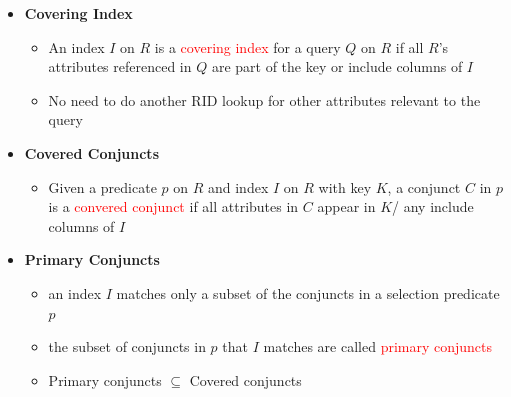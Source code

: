\documentclass[10pt,landscape]{article}
\makeatletter
\newcommand{\subsubsubsection}{\@startsection{subsubsection}{3}{0mm}%
                                {-1ex plus -.5ex minus -.2ex}%
                                {1ex plus .2ex}%
                                {\normalfont\scriptsize\bfseries}}
\newcommand{\1}{\mathmybb{1}}
\makeatother
\begin{document}
\begin{multicols*}{3}


\begin{itemize}
    \item \textbf{Covering Index}
    \begin{itemize}
        \item An index $I$ on $R$ is a \textcolor{red}{covering index} for a query $Q$ on $R$ if all $R$'s attributes referenced in $Q$ are part of the key or include columns of $I$
        \item No need to do another RID lookup for other attributes relevant to the query
    \end{itemize}
    \item \textbf{Covered Conjuncts}
    \begin{itemize}
        \item Given a predicate $p$ on $R$ and index $I$ on $R$ with key $K$, a conjunct $C$ in $p$ is a \textcolor{red}{convered conjunct} if all attributes in $C$ appear in $K$/ any include columns of $I$
    \end{itemize}
    \item \textbf{Primary Conjuncts}
    \begin{itemize}
        \item an index $I$ matches only a subset of the conjuncts in a selection predicate $p$
        \item the subset of conjuncts in $p$ that $I$ matches are called \textcolor{red}{primary conjuncts}
        \item Primary conjuncts $\subseteq$ Covered conjuncts
    \end{itemize}
\end{itemize}


\end{multicols*}
\end{document}
